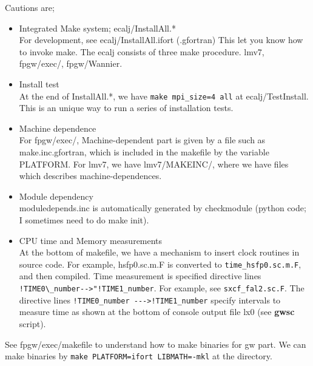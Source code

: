 \documentclass[a4paper,10pt,epsf,fleqn]{article}
\newcommand{\exe}[1]{{\bf #1}}
\newcommand{\io}[1]{{\sf  #1}}
\begin{document}
Cautions are;
\begin{itemize}
\item 
Integrated Make system; \io{ecalj/InstallAll.*}\\
For development, see ecalj/InstallAll.ifort (.gfortran)
This let you know how to invoke make.
The ecalj consists of three make procedure.
lmv7, fpgw/exec/, fpgw/Wannier.
\item Install test\\
At the end of \io{InstallAll.*}, we have \verb#make mpi_size=4 all# at
ecalj/TestInstall. This is an unique way to run 
a series of installation tests.
\item
Machine dependence\\
For fpgw/exec/, Machine-dependent part is given by
a file such as make.inc.gfortran, which is included
in the makefile by the variable PLATFORM.
For \io{lmv7}, we have \io{lmv7/MAKEINC/},
where we have files which describes machine-dependences. 
\item
Module dependency\\
moduledepends.inc is automatically generated by checkmodule (python code; I sometimes need to do make init).
\item CPU time and Memory measurements\\
At the bottom of makefile, we have a mechanism
to insert clock routines in source code.
For example, hsfp0.sc.m.F is converted to
\verb#time_hsfp0.sc.m.F#, and then compiled.
Time measurement is specified directive lines 
\verb#!TIME0\_number-->"!TIME1_number#. For example,
see \verb#sxcf_fal2.sc.F#. The directive lines 
\verb#!TIME0_number --->!TIME1_number# specify intervals to measure time
as shown at the bottom of console output file \io{lx0} (see \exe{gwsc} script).

\end{itemize}
See \io{fpgw/exec/makefile} to understand how to make binaries for gw part.
We can make binaries by \verb#make PLATFORM=ifort LIBMATH=-mkl# at the directory.\\
\end{document}
